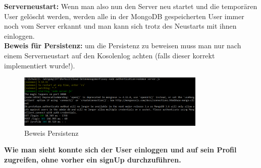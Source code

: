 \textbf{Serverneustart:}
Wenn man also nun den Server neu startet und die temporären User gelöscht werden, werden alle in der MongoDB gespeicherten User immer noch vom Server erkannt und man kann sich trotz des Neustarts mit ihnen einloggen. \\

\textbf{Beweis für Persistenz:}
um die Persistenz zu beweisen muss man nur nach einem Serverneustart auf den Kosolenlog achten (falls dieser korrekt implementiert wurde!).

\begin{figure}[!h] 
	\centering
	\includegraphics[width=0.8\textwidth]{images/beweisPersistenz.PNG}
	\caption{Beweis Persistenz}
	\label{fig:Beweis Persistenz}
\end{figure}

\textbf{Wie man sieht konnte sich der User einloggen und auf sein Profil zugreifen, ohne vorher ein signUp durchzuführen.}
